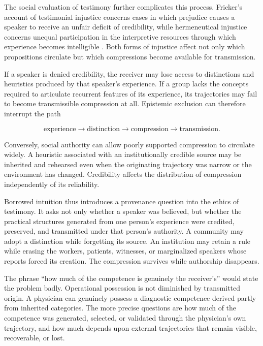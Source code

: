\documentclass[11pt]{article}
\begin{document}
The social evaluation of testimony further complicates this process. Fricker's account of testimonial injustice concerns cases in which prejudice causes a speaker to receive an unfair deficit of credibility, while hermeneutical injustice concerns unequal participation in the interpretive resources through which experience becomes intelligible \cite{fricker2007}. Both forms of injustice affect not only which propositions circulate but which compressions become available for transmission.

If a speaker is denied credibility, the receiver may lose access to distinctions and heuristics produced by that speaker's experience. If a group lacks the concepts required to articulate recurrent features of its experience, its trajectories may fail to become transmissible compression at all. Epistemic exclusion can therefore interrupt the path

\[
\text{experience}
\longrightarrow
\text{distinction}
\longrightarrow
\text{compression}
\longrightarrow
\text{transmission}.
\]

Conversely, social authority can allow poorly supported compression to circulate widely. A heuristic associated with an institutionally credible source may be inherited and rehearsed even when the originating trajectory was narrow or the environment has changed. Credibility affects the distribution of compression independently of its reliability.

Borrowed intuition thus introduces a provenance question into the ethics of testimony. It asks not only whether a speaker was believed, but whether the practical structures generated from one person's experience were credited, preserved, and transmitted under that person's authority. A community may adopt a distinction while forgetting its source. An institution may retain a rule while erasing the workers, patients, witnesses, or marginalized speakers whose reports forced its creation. The compression survives while authorship disappears.

The phrase ``how much of the competence is genuinely the receiver's'' would state the problem badly. Operational possession is not diminished by transmitted origin. A physician can genuinely possess a diagnostic competence derived partly from inherited categories. The more precise questions are how much of the competence was generated, selected, or validated through the physician's own trajectory, and how much depends upon external trajectories that remain visible, recoverable, or lost.
\end{document}
